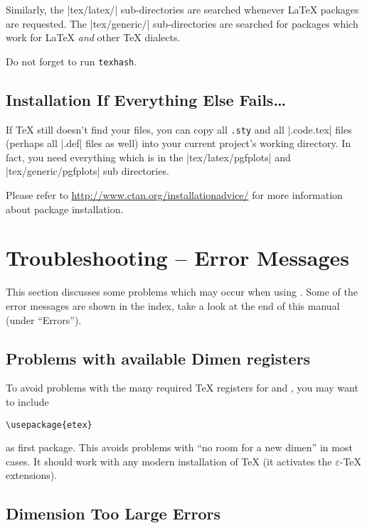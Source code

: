 Similarly, the |tex/latex/| sub-directories are searched whenever
\LaTeX{} packages are requested. The |tex/generic/|
sub-directories are searched for packages which work for \LaTeX{} \emph{and}
other \TeX{} dialects.

Do not forget to run \lstinline!texhash!.

\subsection{Installation If Everything Else Fails\ldots}

If \TeX{} still doesn't find your files, you can copy all \lstinline!.sty! and
all |.code.tex| files (perhaps all |.def| files as well) into your current
project's working directory. In fact, you need everything which is in the
|tex/latex/pgfplots| and |tex/generic/pgfplots| sub directories.

Please refer to \url{http://www.ctan.org/installationadvice/} for more
information about package installation.


\section{Troubleshooting -- Error Messages}

This section discusses some problems which may occur when using \PGFPlots{}.
Some of the error messages are shown in the index, take a look at the end of
this manual (under ``Errors'').


\subsection{Problems with available Dimen registers}

To avoid problems with the many required \TeX{} registers for \PGF{} and
\PGFPlots{}, you may want to include
%
\begin{verbatim}
\usepackage{etex}
\end{verbatim}
%
as first package. This avoids problems with ``no room for a new
dimen'' in most cases. It should
work with any modern installation of \TeX{} (it activates the
$\varepsilon$-\TeX{} extensions).


\subsection{Dimension Too Large Errors}

